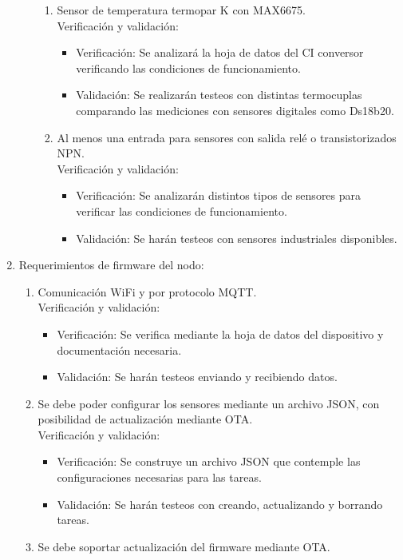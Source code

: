 \documentclass[11pt]{charter}
\begin{document}
\begin{enumerate}
\begin{enumerate}
\begin{enumerate}
		\item Sensor de temperatura termopar K con MAX6675.
			\\Verificación y validación:
			\begin{itemize}
			\item Verificación: Se analizará la hoja de datos del CI conversor verificando las condiciones de funcionamiento.
			\item Validación: Se realizarán testeos con distintas termocuplas comparando las mediciones con sensores digitales como Ds18b20.
			\end{itemize}
		\item Al menos una entrada para sensores con salida relé o transistorizados NPN.
			\\Verificación y validación:
			\begin{itemize}
			\item Verificación: Se analizarán distintos tipos de sensores para verificar las condiciones de funcionamiento.
			\item Validación: Se harán testeos con sensores industriales disponibles.
			\end{itemize}
		\end{enumerate}
	\end{enumerate}
\item Requerimientos de firmware del nodo:
	\begin{enumerate}
	\item Comunicación WiFi y por protocolo MQTT.
		\\Verificación y validación:
		\begin{itemize}
		\item Verificación: Se verifica mediante la hoja de datos del dispositivo y documentación necesaria.
		\item Validación: Se harán testeos enviando y recibiendo datos.
		\end{itemize}
	\item Se debe poder configurar los sensores mediante un archivo JSON, con posibilidad de actualización mediante OTA.
		\\Verificación y validación:
		\begin{itemize}
		\item Verificación: Se construye un archivo JSON que contemple las configuraciones necesarias para las tareas.
		\item Validación: Se harán testeos con creando, actualizando y borrando tareas.
		\end{itemize}
	\item Se debe soportar actualización del firmware mediante OTA.

\end{enumerate}
\end{enumerate}
\end{document}
